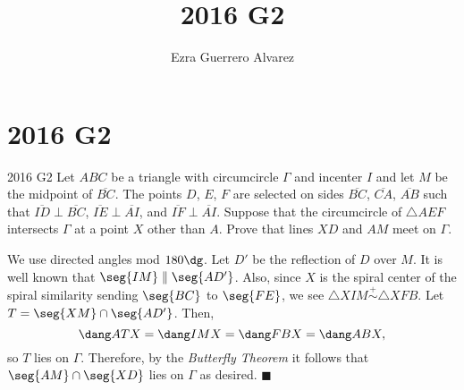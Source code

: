 \documentclass[14pt]{article}
\title{2016 G2}
\author{Ezra Guerrero Alvarez}
\begin{document}
\maketitle
	
\section*{2016 G2}

\begin{statement}{2016 G2}
	Let $ABC$ be a triangle with circumcircle $\Gamma$ and incenter $I$ and let $M$ be the midpoint of $\overline{BC}$. The points $D$, $E$, $F$ are selected on sides $\overline{BC}$, $\overline{CA}$, $\overline{AB}$ such that $\overline{ID} \perp \overline{BC}$, $\overline{IE}\perp \overline{AI}$, and $\overline{IF}\perp \overline{AI}$. Suppose that the circumcircle of $\triangle AEF$ intersects $\Gamma$ at a point $X$ other than $A$. Prove that lines $XD$ and $AM$ meet on $\Gamma$.
\end{statement}
We use directed angles mod $180\dg$. Let $D'$ be the reflection of $D$ over $M$. It is well known that $\seg{IM}\parallel\seg{AD'}$. Also, since $X$ is the spiral center of the spiral similarity sending $\seg{BC}$ to $\seg{FE}$, we see $\triangle XIM\stackrel+\sim\triangle XFB$. Let $T=\seg{XM}\cap\seg{AD'}$. Then,
\[ \dang ATX = \dang IMX = \dang FBX = \dang ABX, \]
so $T$ lies on $\Gamma$. Therefore, by the \emph{Butterfly Theorem} it follows that $\seg{AM}\cap\seg{XD}$ lies on $\Gamma$ as desired. $\blacksquare$
	
\end{document}
